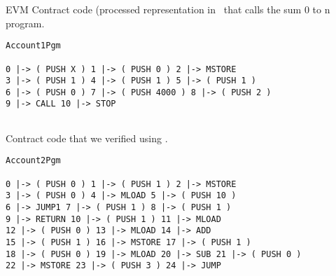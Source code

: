 EVM Contract code (processed representation in \K{} \ that calls the sum 0 to n program.

\begin{verbatim}
Account1Pgm

0 |-> ( PUSH X ) 1 |-> ( PUSH 0 ) 2 |-> MSTORE 
3 |-> ( PUSH 1 ) 4 |-> ( PUSH 1 ) 5 |-> ( PUSH 1 ) 
6 |-> ( PUSH 0 ) 7 |-> ( PUSH 4000 ) 8 |-> ( PUSH 2 ) 
9 |-> CALL 10 |-> STOP 
            
\end{verbatim}

Contract code that we verified using \K{}.


\begin{verbatim}
Account2Pgm

0 |-> ( PUSH 0 ) 1 |-> ( PUSH 1 ) 2 |-> MSTORE 
3 |-> ( PUSH 0 ) 4 |-> MLOAD 5 |-> ( PUSH 10 ) 
6 |-> JUMP1 7 |-> ( PUSH 1 ) 8 |-> ( PUSH 1 ) 
9 |-> RETURN 10 |-> ( PUSH 1 ) 11 |-> MLOAD 
12 |-> ( PUSH 0 ) 13 |-> MLOAD 14 |-> ADD 
15 |-> ( PUSH 1 ) 16 |-> MSTORE 17 |-> ( PUSH 1 ) 
18 |-> ( PUSH 0 ) 19 |-> MLOAD 20 |-> SUB 21 |-> ( PUSH 0 ) 
22 |-> MSTORE 23 |-> ( PUSH 3 ) 24 |-> JUMP
\end{verbatim}

